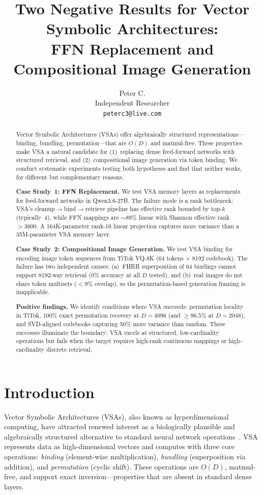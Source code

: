 \documentclass{article}
\title{Two Negative Results for Vector Symbolic Architectures:\\
FFN Replacement and Compositional Image Generation}
\author{
Peter C.\\
Independent Researcher\\
\texttt{peterc3@live.com}
}
\begin{document}
\maketitle

\begin{abstract}
Vector Symbolic Architectures (VSAs) offer algebraically structured representations---binding, bundling, permutation---that are $O(D)$ and matmul-free.
These properties make VSA a natural candidate for (1)~replacing dense feed-forward networks with structured retrieval, and (2)~compositional image generation via token binding.
We conduct systematic experiments testing both hypotheses and find that neither works, for different but complementary reasons.

\textbf{Case Study~1: FFN Replacement.}
We test VSA memory layers as replacements for feed-forward networks in Qwen3.6-27B.
The failure mode is a rank bottleneck: VSA's cleanup$\to$bind$\to$retrieve pipeline has effective rank bounded by top-$k$ (typically~4), while FFN mappings are ${\sim}89\%$ linear with Shannon effective rank ${>}3600$.
A 164K-parameter rank-16 linear projection captures more variance than a 35M-parameter VSA memory layer.

\textbf{Case Study~2: Compositional Image Generation.}
We test VSA binding for encoding image token sequences from TiTok VQ-8K (64 tokens $\times$ 8192 codebook).
The failure has two independent causes: (a)~FHRR superposition of 64 bindings cannot support 8192-way retrieval ($0\%$ accuracy at all $D$ tested), and (b)~real images do not share token multisets (${<}9\%$ overlap), so the permutation-based generation framing is inapplicable.

\textbf{Positive findings.}
We identify conditions where VSA succeeds: permutation locality in TiTok, 100\% exact permutation recovery at $D{=}4096$ (and ${\ge}96.5\%$ at $D{=}2048$), and SVD-aligned codebooks capturing 50\% more variance than random.
These successes illuminate the boundary: VSA excels at structured, low-cardinality operations but fails when the target requires high-rank continuous mappings or high-cardinality discrete retrieval.
\end{abstract}

\section{Introduction}
\label{sec:intro}

Vector Symbolic Architectures (VSAs), also known as hyperdimensional computing, have attracted renewed interest as a biologically plausible and algebraically structured alternative to standard neural network operations~\citep{kanerva2009hyperdimensional, plate2003holographic}.
VSA represents data as high-dimensional vectors and computes with three core operations: \emph{binding} (element-wise multiplication), \emph{bundling} (superposition via addition), and \emph{permutation} (cyclic shift).
These operations are $O(D)$, matmul-free, and support exact inversion---properties that are absent in standard dense layers.
\end{document}
